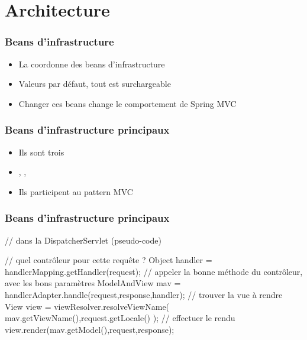 \section{Architecture}


\begin{frame}
 \frametitle{Beans d'infrastructure}
 \begin{itemize}
  \item La  coordonne des beans d'infrastructure
  \item Valeurs par défaut, tout est surchargeable
  \item Changer ces beans change le comportement de Spring MVC
 \end{itemize}
\end{frame}

\begin{frame}
 \frametitle{Beans d'infrastructure principaux}
 
 \begin{itemize}
  \item Ils sont trois
  \item {}, , 
  \item Ils participent au pattern MVC
 \end{itemize} 

\end{frame}

\begin{frame}[fragile]
 \frametitle{Beans d'infrastructure principaux}
 
 \begin{javacode}
// dans la DispatcherServlet (pseudo-code)

// quel contr\^oleur pour cette requ\^ete ?
Object handler = handlerMapping.getHandler(request);
// appeler la bonne m\'ethode du contr\^oleur, avec les bons param\`etres
ModelAndView mav = handlerAdapter.handle(request,response,handler);
// trouver la vue \`a rendre
View view = viewResolver.resolveViewName(
  mav.getViewName(),request.getLocale()
);
// effectuer le rendu
view.render(mav.getModel(),request,response);
 \end{javacode}

\end{frame}

